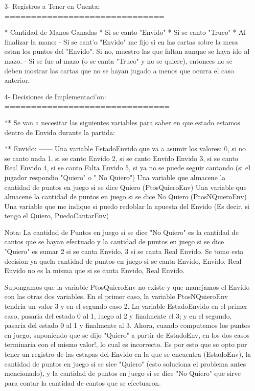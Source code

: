 3- Registros a Tener en Cuenta:
==============================

  * Cantidad de Manos Ganadas
  * Si se canto "Envido"
  * Si se canto "Truco"
  * Al finalizar la mano:
    - Si se cant'o "Envido" me fijo si en las cartas sobre la mesa estan los puntos del "Envido". Si no, muestro las que faltan aunque se haya ido al mazo.
    - Si se fue al mazo (o se canta "Truco" y no se quiere), entonces no se deben mostrar las cartas que no se hayan jugado a menos que ocurra el caso anterior.


4- Decisiones de Implementaci'on:
===============================

** Se van a necesitar las siguientes variables para saber en que estado estamos dentro de Envido durante la
partida:

** Envido:
   ------
  Una variable EstadoEnvido que va a asumir los valores:
    0, si no se canto nada
    1, si se canto Envido
    2, si se canto Envido Envido
    3, si se canto Real Envido
    4, si se canto Falta Envido
    5, si ya no se puede seguir cantando (si el jugador respondio "Quiero" o " No Quiero")
  Una variable que almacene la cantidad de puntos en juego si se dice Quiero (PtosQuieroEnv)
  Una variable que almacene la cantidad de puntos en juego si se dice No Quiero (PtosNQuieroEnv)
  Una variable que me indique si puedo redoblar la apuesta del Envido (Es decir, si tengo el Quiero, PuedoCantarEnv)

Nota:
  La cantidad de Puntos en juego si se dice "No Quiero" es la cantidad de cantos que se hayan efectuado y la cantidad
de puntos en juego si se dice "Quiero" es sumar 2 si se canta Envido, 3 si se canta Real Envido. Se tomo esta decision ya quela cantidad de puntos en juego si se canta Envido, Envido, Real Envido no es la misma que si se canta Envido, Real Envido.

  Supongamos que la variable PtosQuieroEnv no existe y que manejamos el Envido con las otras dos variables. En el primer caso, la variable PtosNQuieroEnv tendria un valor 3 y en el segundo caso 2. La variable EstadoEnvido en el primer caso, pasaria del estado 0 al 1, luego al 2 y finalmente el 3; y en el segundo, pasaria del estado 0 al 1 y finalmente al 3. Ahora, cuando computemos los puntos en juego, suponiendo que se dijo "Quiero" a partir de EstadoEnv, en los dos casos terminaria con el mismo valor!, lo cual es incorrecto. Es por esto que se opto por tener un registro de las estapas del Envido en la que se encuentra (EstadoEnv), la cantidad de puntos en juego si se sice "Quiero" (esto soluciona el problema antes mencionado), y la cantidad de puntos en juego si se dice "No Quiero" que sirve para contar la cantidad de cantos que se efectuaron.

